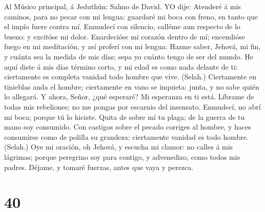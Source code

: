  Al Músico principal, á Jeduthún: Salmo de David. YO dije:
Atenderé á mis caminos, para no pecar con mi lengua: guardaré mi boca
con freno, en tanto que el impío fuere contra mí. 
Enmudecí con silencio, calléme aun respecto de lo bueno: y excitóse mi
dolor.  Enardecióse mi corazón dentro de mí; encendióse
fuego en mi meditación, y así proferí con mi lengua: 
Hazme saber, Jehová, mi fin, y cuánta sea la medida de mis días; sepa yo
cuánto tengo de ser del mundo.  He aquí diste á mis días
término corto, y mi edad es como nada delante de ti: ciertamente es
completa vanidad todo hombre que vive. (Selah.) 
Ciertamente en tinieblas anda el hombre; ciertamente en vano se
inquieta: junta, y no sabe quién lo allegará.  Y ahora,
Señor, ¿qué esperaré? Mi esperanza en ti está.  Líbrame de
todas mis rebeliones; no me pongas por escarnio del insensato.
 Enmudecí, no abrí mi boca; porque tú lo hiciste.
 Quita de sobre mí tu plaga; de la guerra de tu mano soy
consumido.  Con castigos sobre el pecado corriges al
hombre, y haces consumirse como de polilla su grandeza: ciertamente
vanidad es todo hombre. (Selah.)  Oye mi oración, oh
Jehová, y escucha mi clamor: no calles á mis lágrimas; porque peregrino
soy para contigo, y advenedizo, como todos mis padres. 
Déjame, y tomaré fuerzas, antes que vaya y perezca.

\hypertarget{section-39}{%
\section{40}\label{section-39}}

